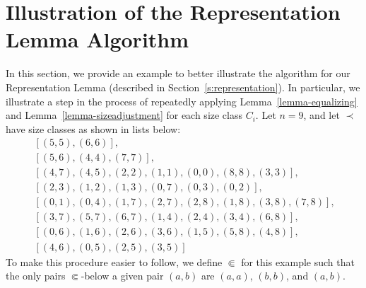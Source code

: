 \documentclass[letterpaper]{article} %
\theoremstyle{definition}
\begin{document}
\section{Illustration of the Representation Lemma Algorithm}
\label{s:supp:illustration}


In this section, we provide an example to better illustrate the algorithm for our Representation Lemma (described in Section~\ref{s:representation}).  In particular, we illustrate a step in the process of repeatedly applying Lemma~\ref{lemma-equalizing} and Lemma~\ref{lemma-sizeadjustment} for each size class $C_i$.  Let $n = 9$, and let $\prec$ have size classes as shown in lists below:
\[
 \begin{array}{l}
\ [(5,5),(6,6)], \\
 \  [(5,6),(4,4),(7,7)], \\
  \  [(4,7),(4,5),(2, 2),(1,1),(0,0),(8,8), (3,3)],\\
  \ [(2,3),  (1,2),(1,3),(0,7),(0,3), (0,2)],\\
\	    [(0,1), (0,4),(1,7),(2,7), (2,8),(1,8), (3,8), (7,8)],\\
 \        [(3,7), (5,7),(6,7),(1,4),(2,4), (3,4), (6,8)], \\
\	    [(0,6),(1,6),(2,6),(3,6),(1,5), (5,8), (4,8)],\\
 \        [(4,6),(0,5),(2,5),(3,5)]
         \end{array}
\]
To make this procedure easier to follow, we define $\Subset$ for this example such that the only pairs $\Subset$-below a given pair $(a, b)$ are $(a, a)$, $(b, b)$, and $(a, b)$.
 
\end{document}
